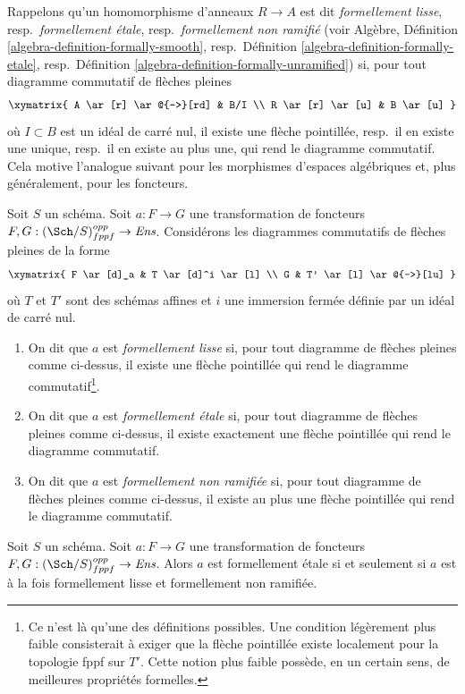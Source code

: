 \noindent
Rappelons qu'un homomorphisme d'anneaux $R \to A$ est dit
{\it formellement lisse}, resp.\ {\it formellement étale},
resp.\ {\it formellement non ramifié}
(voir Algèbre, Définition \ref{algebra-definition-formally-smooth},
resp.\ Définition \ref{algebra-definition-formally-etale},
resp.\ Définition \ref{algebra-definition-formally-unramified})
si, pour tout diagramme commutatif de flèches pleines
$$
\xymatrix{
A \ar[r] \ar@{-->}[rd] & B/I \\
R \ar[r] \ar[u] & B \ar[u]
}
$$
où $I \subset B$ est un idéal de carré nul, il
existe une flèche pointillée, resp.\ il en existe une unique, resp.\ il en existe
au plus une, qui rend le diagramme commutatif. Cela motive
l'analogue suivant pour les morphismes d'espaces algébriques et, plus
généralement, pour les foncteurs.

\begin{definition}
\label{definition-formally-smooth-etale-unramified}
Soit $S$ un schéma.
Soit $a : F \to G$ une transformation de foncteurs
$F, G : (\Sch/S)_{fppf}^{opp} \to \textit{Ens}$.
Considérons les diagrammes commutatifs de flèches pleines de la forme
$$
\xymatrix{
F \ar[d]_a & T \ar[d]^i \ar[l] \\
G & T' \ar[l] \ar@{-->}[lu]
}
$$
où $T$ et $T'$ sont des schémas affines et $i$ une immersion fermée
définie par un idéal de carré nul.
\begin{enumerate}
\item On dit que $a$ est {\it formellement lisse} si, pour tout
diagramme de flèches pleines comme ci-dessus, il existe une flèche pointillée qui rend le diagramme
commutatif\footnote{Ce n'est là qu'une des définitions possibles.
Une condition légèrement plus faible consisterait à exiger que
la flèche pointillée existe localement pour la topologie fppf sur $T'$. Cette notion plus faible
possède, en un certain sens, de meilleures propriétés formelles.}.
\item On dit que $a$ est {\it formellement étale} si, pour tout
diagramme de flèches pleines comme ci-dessus, il existe exactement une flèche pointillée qui rend le diagramme
commutatif.
\item On dit que $a$ est {\it formellement non ramifiée} si, pour tout
diagramme de flèches pleines comme ci-dessus, il existe au plus une flèche pointillée qui rend le diagramme
commutatif.
\end{enumerate}
\end{definition}

\begin{lemma}
\label{lemma-formally-etale-is-combination}
Soit $S$ un schéma.
Soit $a : F \to G$ une transformation de foncteurs
$F, G : (\Sch/S)_{fppf}^{opp} \to \textit{Ens}$.
Alors $a$ est formellement étale si et seulement si $a$ est à la fois formellement
lisse et formellement non ramifiée.
\end{lemma}

